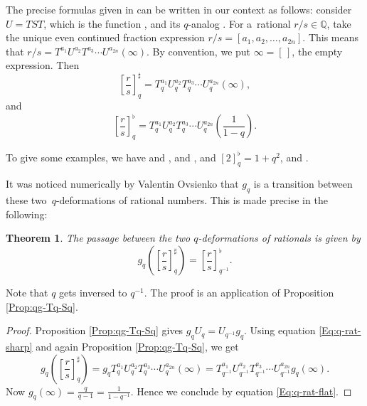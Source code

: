 \documentclass[10pt,a4paper]{amsart}
\numberwithin{equation}{section}
\newtheorem{Theorem}{Theorem}[section]
\newcommand*{\Q}{\mathbb{Q}}
\begin{document}
The precise formulas given in \cite[Definition~2.6]{bapat2023q} can be written in our context as follows: consider $U=TST$, which is the function , and its $q$-analog . For a~rational $r/s\in \Q$, take the unique even continued fraction expression $r/s=[a_1,a_2,\dots,a_{2n}]$. This means that $r/s=T^{a_1}U^{a_2}T^{a_3}\cdots U^{a_{2n}}(\infty)$. By convention, we put $\infty=[\,]$, the empty expression. Then
\begin{equation}\label{Eq:q-rat-sharp}
\left[\frac{r}{s}\right]_q^\sharp = T_q^{a_1}U_q^{a_2}T_q^{a_3}\cdots U_q^{a_{2n}}(\infty),
\end{equation}
and
\begin{equation}\label{Eq:q-rat-flat}
\left[\frac{r}{s}\right]_q^\flat = T_q^{a_1}U_q^{a_2}T_q^{a_3}\cdots U_q^{a_{2n}}\left(\frac{1}{1-q}\right).
\end{equation}

To give some examples, we have  and ,  and ,  and $[2]_q^\flat=1+q^2$,  and .


It was noticed numerically by Valentin Ovsienko that $g_q$ is a transition between these two~$q$-deformations of rational numbers. This is made precise in the following:

\begin{Theorem}\label{Thm:passage}
The passage between the two $q$-deformations of rationals is given by
\[
g_q\left(\left[\frac{r}{s}\right]_q^\sharp\right)=\left[\frac{r}{s}\right]_{q^{-1}}^\flat.
\]
\end{Theorem}

Note that $q$ gets inversed to $q^{-1}$. The proof is an application of Proposition \ref{Prop:qg-Tq-Sq}.

\begin{proof}
Proposition \ref{Prop:qg-Tq-Sq} gives $g_qU_q=U_{q^{-1}}g_q$. Using equation \eqref{Eq:q-rat-sharp} and again Proposition \ref{Prop:qg-Tq-Sq}, we get
\[
g_q\left(\left[\frac{r}{s}\right]_q^\sharp\right)=g_qT_q^{a_1}U_q^{a_2}T_q^{a_3}\cdots U_q^{a_{2n}}(\infty)=T_{q^{-1}}^{a_1}U_{q^{-1}}^{a_2}T_{q^{-1}}^{a_3}\cdots U_{q^{-1}}^{a_{2n}}g_q(\infty).
\]
Now $g_q(\infty)=\tfrac{q}{q-1}=\tfrac{1}{1-q^{-1}}$. Hence we conclude by equation \eqref{Eq:q-rat-flat}.
\end{proof}
\end{document}
